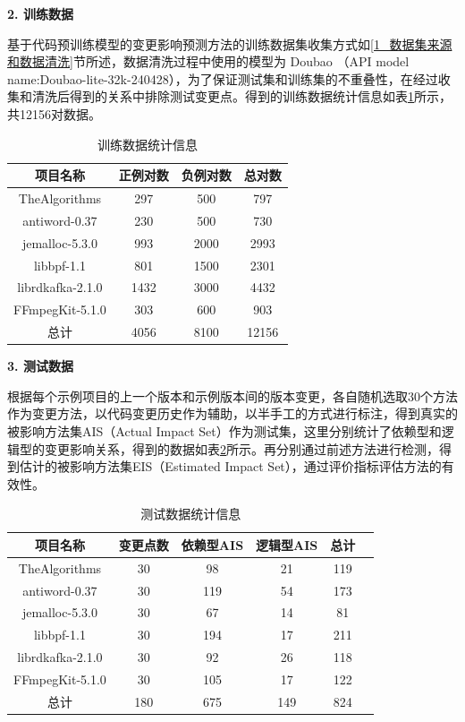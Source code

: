 \noindent \textbf{2. 训练数据}

基于代码预训练模型的变更影响预测方法的训练数据集收集方式如\ref{1_数据集来源和数据清洗}节所述，数据清洗过程中使用的模型为 Doubao （API model name:Doubao-lite-32k-240428），为了保证测试集和训练集的不重叠性，在经过收集和清洗后得到的关系中排除测试变更点。得到的训练数据统计信息如表\ref{1_数据集统计信息1}所示，共12156对数据。

\begin{table}[htbp]
\caption{训练数据统计信息}
\label{1_数据集统计信息1}
\vspace{0.5em}\centering\wuhao
\begin{tabular}{cccc}
\toprule
项目名称 & 正例对数 & 负例对数 & 总对数 \\
\midrule
TheAlgorithms    & 297 & 500 & 797 \\
antiword-0.37    & 230 & 500  & 730 \\
jemalloc-5.3.0   & 993 & 2000 & 2993 \\
libbpf-1.1       & 801 & 1500 & 2301 \\
librdkafka-2.1.0 & 1432  & 3000 & 4432 \\
FFmpegKit-5.1.0  & 303 & 600 & 903 \\ 
总计              & 4056 & 8100 & 12156 \\
\bottomrule
\end{tabular}
\end{table}


\noindent \textbf{3. 测试数据}

根据每个示例项目的上一个版本和示例版本间的版本变更，各自随机选取30个方法作为变更方法，以代码变更历史作为辅助，以半手工的方式进行标注，得到真实的被影响方法集AIS（Actual Impact Set）作为测试集，这里分别统计了依赖型和逻辑型的变更影响关系，得到的数据如表\ref{1_test_data_info}所示。再分别通过前述方法进行检测，得到估计的被影响方法集EIS（Estimated Impact Set），通过评价指标评估方法的有效性。

\begin{table}[htbp]
\caption{测试数据统计信息}
\label{1_test_data_info}
\vspace{0.5em}\centering\wuhao
\begin{tabular}{cccccc}
\toprule
项目名称  & 变更点数 & 依赖型AIS & 逻辑型AIS & 总计 \\
\midrule
TheAlgorithms  & 30 & 98 & 21 & 119\\
antiword-0.37  & 30 & 119 & 54 & 173 \\
jemalloc-5.3.0   & 30 & 67 & 14 & 81 \\
libbpf-1.1  & 30 & 194 & 17 & 211 \\
librdkafka-2.1.0  & 30 & 92 & 26 & 118\\
FFmpegKit-5.1.0  & 30 & 105 & 17 & 122\\
总计  & 180 & 675 & 149 & 824 \\
\bottomrule
\end{tabular}
\end{table}



